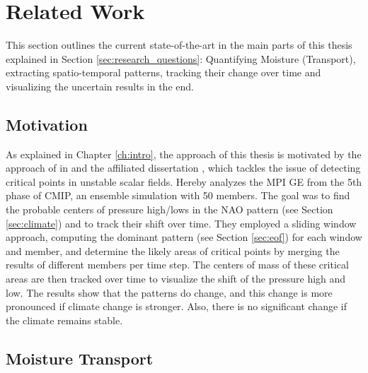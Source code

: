 \chapter{Related Work}
\label{ch:related_work}

This section outlines the current state-of-the-art in the main parts of this thesis explained in Section \ref{sec:research_questions}: Quantifying Moisture (Transport), extracting spatio-temporal patterns, tracking their change over time and visualizing the uncertain results in the end.

\section{Motivation}

As explained in Chapter \ref{ch:intro}, the approach of this thesis is motivated by the approach of \citeauthor{vietinghoff_visual_2021} in \cite{vietinghoff_visual_2021} and the affiliated dissertation \cite{vietinghoffdiss}, which tackles the issue of detecting critical points in unstable scalar fields.
Hereby \cite{vietinghoff_visual_2021} analyzes the MPI GE \cite{maher_max_2019} from the 5th phase of CMIP, an ensemble simulation with 50 members. 
The goal was to find the probable centers of pressure high/lows in the NAO pattern (see Section \ref{sec:climate}) and to track their shift over time. 
They employed a sliding window approach, computing the dominant pattern (see Section \ref{sec:eof})  for each window and member, and determine the likely areas of critical points by merging the results of different members per time step. 
The centers of mass of these critical areas are then tracked over time to visualize the shift of the pressure high and low. 
The results show that the patterns do change, and this change is more pronounced if climate change is stronger. 
Also, there is no significant change if the climate remains stable.


\section{Moisture Transport}


